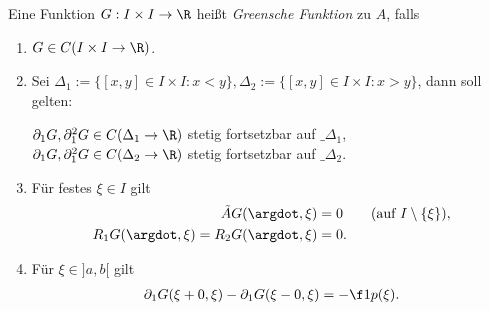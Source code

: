 \begin{df} \label{3.11}
	Eine Funktion $G: I \times I \to \R$ heißt \emph{Greensche Funktion} zu $A$, falls
	\begin{enumerate}[1)]
		\item
			$G \in C(I\times I \to \R)$.
		\item
			Sei $\Delta_1:=\{[x,y]\in I \times I : x < y\}, \Delta_2:=\{[x,y]\in I \times I : x > y\}$, dann soll gelten:

			$\partial_1 G, \partial_1^2 G \in C(\Delta_1 \to \R)$ stetig fortsetzbar auf $\_{\Delta_1}$, \\
			$\partial_1 G, \partial_1^2 G \in C(\Delta_2 \to \R)$ stetig fortsetzbar auf $\_{\Delta_2}$.
		\item
			Für festes $\xi \in I$ gilt
			\begin{align*}
				\tilde A G(\argdot, \xi) &= 0 \qquad \text{(auf $I \setminus \{\xi\}$)}, \\
				R_1 G(\argdot, \xi) = R_2 G(\argdot, \xi) &= 0.
			\end{align*}
		\item
			Für $\xi \in ]a,b[$ gilt
			\begin{align*}
				\partial_1 G (\xi + 0, \xi) - \partial_1 G(\xi - 0, \xi) = -\f 1{p(\xi)}.
			\end{align*}
	\end{enumerate}
\end{df}

